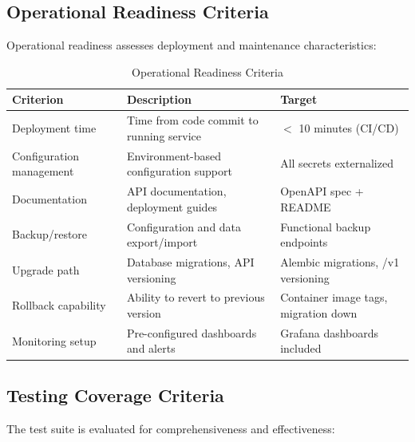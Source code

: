 \documentclass[a4paper,twoside]{sapthesis}
\begin{document}
\subsection{Operational Readiness Criteria}
\label{subsec:operational-criteria}

Operational readiness assesses deployment and maintenance characteristics:

\begin{table}[htbp]
\centering
\caption{Operational Readiness Criteria}
\label{tab:operational-eval}
\small
\begin{tabularx}{\textwidth}{|l|X|l|}
\hline
\textbf{Criterion} & \textbf{Description} & \textbf{Target} \\
\midrule
Deployment time & Time from code commit to running service & $<$ 10 minutes (CI/CD) \\
\midrule
Configuration management & Environment-based configuration support & All secrets externalized \\
\midrule
Documentation & API documentation, deployment guides & OpenAPI spec + README \\
\midrule
Backup/restore & Configuration and data export/import & Functional backup endpoints \\
\midrule
Upgrade path & Database migrations, API versioning & Alembic migrations, /v1 versioning \\
\midrule
Rollback capability & Ability to revert to previous version & Container image tags, migration down \\
\midrule
Monitoring setup & Pre-configured dashboards and alerts & Grafana dashboards included \\
\midrule
\end{tabularx}
\end{table}

\subsection{Testing Coverage Criteria}
\label{subsec:testing-criteria}

The test suite is evaluated for comprehensiveness and effectiveness:
\end{document}
